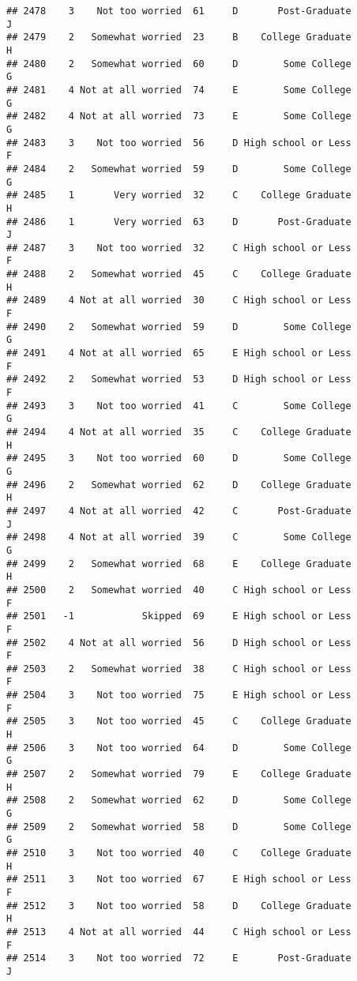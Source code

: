 \documentclass[
]{article}
\begin{document}
\begin{verbatim}
## 2478    3    Not too worried  61     D       Post-Graduate         J
## 2479    2   Somewhat worried  23     B    College Graduate         H
## 2480    2   Somewhat worried  60     D        Some College         G
## 2481    4 Not at all worried  74     E        Some College         G
## 2482    4 Not at all worried  73     E        Some College         G
## 2483    3    Not too worried  56     D High school or Less         F
## 2484    2   Somewhat worried  59     D        Some College         G
## 2485    1       Very worried  32     C    College Graduate         H
## 2486    1       Very worried  63     D       Post-Graduate         J
## 2487    3    Not too worried  32     C High school or Less         F
## 2488    2   Somewhat worried  45     C    College Graduate         H
## 2489    4 Not at all worried  30     C High school or Less         F
## 2490    2   Somewhat worried  59     D        Some College         G
## 2491    4 Not at all worried  65     E High school or Less         F
## 2492    2   Somewhat worried  53     D High school or Less         F
## 2493    3    Not too worried  41     C        Some College         G
## 2494    4 Not at all worried  35     C    College Graduate         H
## 2495    3    Not too worried  60     D        Some College         G
## 2496    2   Somewhat worried  62     D    College Graduate         H
## 2497    4 Not at all worried  42     C       Post-Graduate         J
## 2498    4 Not at all worried  39     C        Some College         G
## 2499    2   Somewhat worried  68     E    College Graduate         H
## 2500    2   Somewhat worried  40     C High school or Less         F
## 2501   -1            Skipped  69     E High school or Less         F
## 2502    4 Not at all worried  56     D High school or Less         F
## 2503    2   Somewhat worried  38     C High school or Less         F
## 2504    3    Not too worried  75     E High school or Less         F
## 2505    3    Not too worried  45     C    College Graduate         H
## 2506    3    Not too worried  64     D        Some College         G
## 2507    2   Somewhat worried  79     E    College Graduate         H
## 2508    2   Somewhat worried  62     D        Some College         G
## 2509    2   Somewhat worried  58     D        Some College         G
## 2510    3    Not too worried  40     C    College Graduate         H
## 2511    3    Not too worried  67     E High school or Less         F
## 2512    3    Not too worried  58     D    College Graduate         H
## 2513    4 Not at all worried  44     C High school or Less         F
## 2514    3    Not too worried  72     E       Post-Graduate         J

\end{verbatim}
\end{document}
